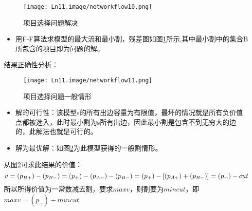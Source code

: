 \begin{figure}[htb]
  \centering
  \texttt{[image: Ln11.image/networkflow10.png]}
  \caption{项目选择问题解决}\label{fig10}
\end{figure}

\begin{itemize}
  \item 用F-F算法求模型的最大流和最小割，残差图如图\ref{fig10}所示,其中最小割中的集合B所包含的项目即为问题的解。
\end{itemize}

结果正确性分析：
\begin{figure}[htb]
  \centering
  \texttt{[image: Ln11.image/networkflow11.png]}
  \caption{项目选择问题一般情形}\label{fig11}
\end{figure}

\begin{itemize}
\item 解的可行性：该模型s的所有出边容量为有限值，最坏的情况就是所有负价值点都被选入，此时最小割为s所有出边，因此最小割是包含不到无穷大的边的，此解法也就是可行的。
\item 解为最优解：如图\ref{fig11}为此模型获得的一般割情形。
\end{itemize}
从图\ref{fig11}可求此结果的价值：
\begin{equation}
v = (p_{B+}) - (p_{B-}) = (p_+) - (p_{A+}) - (p_{B-}) = (p_+) - [(p_{A+}) + (p_{B-})] = (p_+) - cut\\
\end{equation}
所以所得价值为一常数减去割，要求\(maxv\)，则割要为\(mincut\)，即\(maxv = (p_+) -mincut\)

